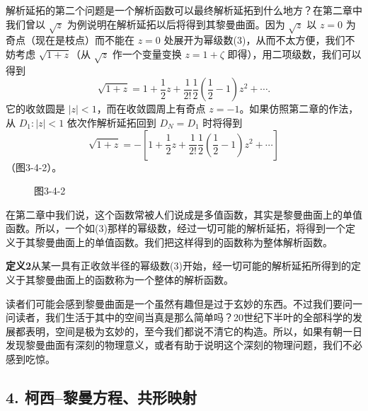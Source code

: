 解析延拓的第二个问题是一个解析函数可以最终解析延拓到什么地方？在第二章中我们曾以 $\sqrt z$ 为例说明在解析延拓以后将得到其黎曼曲面。因为 $\sqrt z$ 以 $z=0$ 为奇点（现在是枝点）而不能在 $z=0$ 处展开为幂级数(3)，从而不太方便，我们不妨考虑 $\sqrt{1+z}$（从 $\sqrt z$ 作一个变量变换 $z=1+\zeta$ 即得），用二项级数，我们可以得到
\[
 \sqrt{1+z}=1+\frac12z+\frac1{2!}\frac12\left(\frac12-1\right)z^2+\cdots.
\]
它的收敛圆是 $|z|<1$，而在收敛圆周上有奇点 $z=-1$。如果仿照第二章的作法，从 $D_1:|z|<1$ 依次作解析延拓回到 $D_N=D_1$ 时将得到
\[
 \sqrt{1+z}=-\left[1+\frac12z+\frac1{2!}\frac12\left(\frac12-1\right)z^2+\cdots\right]
\]
（图3-4-2）。
\begin{figure}[htbp]
\centering
{}
\caption*{图3-4-2}
\end{figure}
在第二章中我们说，这个函数常被人们说成是多值函数，其实是黎曼曲面上的单值函数。所以，一个如(3)那样的幂级数，经过一切可能的解析延拓，将得到一个定义于其黎曼曲面上的单值函数。我们把这样得到的函数称为整体解析函数。

\noindent\textbf{定义2}\quad 从某一具有正收敛半径的幂级数(3)开始，经一切可能的解析延拓所得到的定义于其黎曼曲面上的函数称为一个整体的解析函数。

读者们可能会感到黎曼曲面是一个虽然有趣但是过于玄妙的东西。不过我们要问一问读者，我们生活于其中的空间当真是那么简单吗？20世纪下半叶的全部科学的发展都表明，空间是极为玄妙的，至今我们都说不清它的构造。所以，如果有朝一日发现黎曼曲面有深刻的物理意义，或者有助于说明这个深刻的物理问题，我们不必感到吃惊。

\subsection*{4. 柯西--黎曼方程、共形映射}

